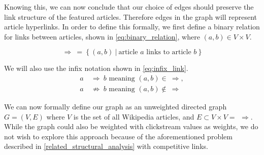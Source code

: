 Knowing this, we can now conclude that our choice of edges should preserve the link structure of the featured articles. Therefore edges in the graph will represent article hyperlinks. In order to define this formally, we first define a binary relation for links between articles, shown in \cref{eq:binary_relation}, where $(a,b) \in V \times V$. 

\begin{equation}
\label{eq:binary_relation}
\Rightarrow\ =\ \{\ (a,b)\ |\ \text{article } a \text{ links to article } b\ \}
\end{equation}

We will also use the infix notation shown in \cref{eq:infix_link}.
\begin{equation}
\label{eq:infix_link}
  \begin{split}
    a\ & \Rightarrow\ b \text{ meaning } (a,b) \in\ \Rightarrow,\\
    a\ & \not\Rightarrow\ b \text{ meaning } (a,b) \not\in\ \Rightarrow
  \end{split}
\end{equation}

We can now formally define our graph as an unweighted directed graph $G = (V,E)$ where $V$ is the set of all Wikipedia articles, and $E\subset V \times V = \ \, \Rightarrow$. While the graph could also be weighted with clickstream values as weights, we do not wish to explore this approach because of the aforementioned problem described in \cref{related_structural_analysis} with competitive links.